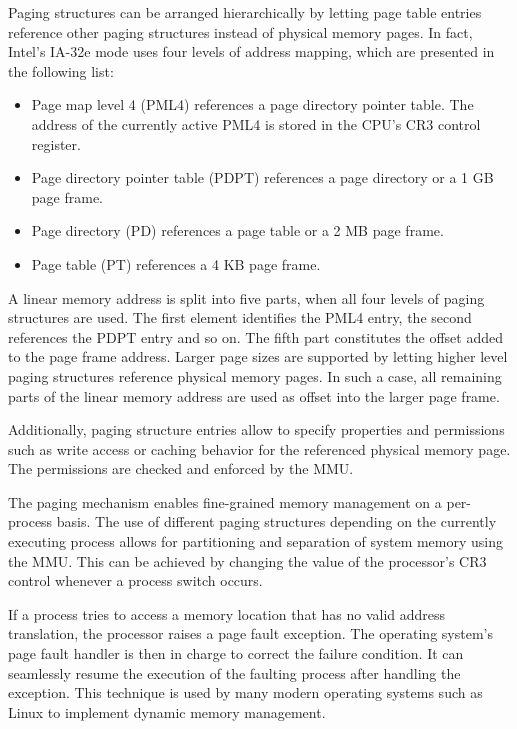 Paging structures can be arranged hierarchically by letting page table entries
reference other paging structures instead of physical memory pages. In fact,
Intel's IA-32e mode uses four levels of address mapping, which are presented in
the following list:

\begin{itemize}
	\item Page map level 4 (PML4) references a page directory
		pointer table. The address of the currently active PML4 is stored in
		the CPU's CR3 control register.
	\item Page directory pointer table (PDPT) references a page
		directory or a 1 GB page frame.
	\item Page directory (PD) references a page table or a 2 MB page
		frame.
	\item Page table (PT) references a 4 KB page frame.
\end{itemize}

A linear memory address is split into five parts, when all four levels of paging
structures are used. The first element identifies the PML4 entry, the second
references the PDPT entry and so on. The fifth part constitutes the offset added
to the page frame address. Larger page sizes are supported by letting higher
level paging structures reference physical memory pages. In such a case, all
remaining parts of the linear memory address are used as offset into the larger
page frame.

Additionally, paging structure entries allow to specify properties and
permissions such as write access or caching behavior for the referenced
physical memory page. The permissions are checked and enforced by the MMU.

The paging mechanism enables fine-grained memory management on a per-process
basis. The use of different paging structures depending on the currently
executing process allows for partitioning and separation of system memory using
the MMU. This can be achieved by changing the value of the processor's CR3
control whenever a process switch occurs.

If a process tries to access a memory location that has no valid address
translation, the processor raises a page fault exception. The operating system's
page fault handler is then in charge to correct the failure condition. It can
seamlessly resume the execution of the faulting process after handling the
exception. This technique is used by many modern operating systems such as Linux
to implement dynamic memory management.

